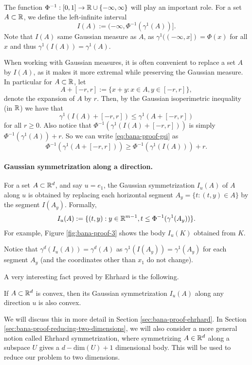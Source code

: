 The function $\Phi^{-1}:[0,1] \rightarrow  \mathbb{R} \cup \{-\infty,\infty\}$ will play an important role.
For a set $A\subset \mathbb{R}$, we define the left-infinite interval  \[I(A):=(-\infty,\Phi^{-1}(\gamma^1(A))].\]   Note that $I(A)$ same Gaussian measure as $A$, as $\gamma^1((-\infty,x]) = \Phi(x)$ for all $x$ and thus $\gamma^1(I(A))= \gamma^1(A)$.

When working with Gaussian measures, it is often convenient to replace a set $A$ by $I(A)$, as it makes it more extremal while  preserving the Gaussian measure. 
In particular for $A\subset \mathbb{R}$, let  \[A+[-r,r] := \{x+y:x\in A, y\in [-r,r]\},\]
denote the expansion of $A$ by $r$.
Then, by the Gaussian isoperimetric inequality (in $\mathbb{R}$) we have that 
 \begin{equation}
     \label{eq:bana-proof-gsi}
      \gamma^1(I(A)+[-r,r]) \leq \gamma^1(A+[-r,r])
 \end{equation}
  for all $r\geq 0$.
Also notice that $\Phi^{-1}(\gamma^1(I(A)+[-r,r]))$ is simply $ \Phi^{-1}(\gamma^1(A)) + r$. So we can write \eqref{eq:bana-proof-gsi} as
\begin{equation}
    \label{eq:bana-proof-gsi-cor} \Phi^{-1}(\gamma^1(A+[-r,r]))\geq  \Phi^{-1}(  \gamma^1(I(A))) +r.
\end{equation}



\paragraph{ Gaussian symmetrization along a direction.}
For a set $A \subset \mathbb{R}^d$, and say $u=e_1$, the Gaussian symmetrization $I_u(A)$ of $A$ along $u$ is obtained by replacing each horizontal segment $A_y = \{t:(t,y)\in A\}$ by the segment $I(A_y)$.
Formally,
\[ I_u(A) := \{ (t,y): y\in\mathbb{R}^{m-1}, t \leq \Phi^{-1}(\gamma^1(A_y))\}.\]
For example, Figure \ref{fig:bana-proof-3} shows the body $I_u(K)$ obtained from $K$.

Notice that $\gamma^d(I_u(A)) =\gamma^d(A)$ as $\gamma^1(I(A_y)) = \gamma^1(A_y)$ for each segment $A_y$ (and the coordinates other than $x_1$ do not change). 



A very interesting fact proved by Ehrhard \cite{Ehrhard1983} is the following.
\begin{theorem}
\label{thm:baby-ehrhard}
    If $A \subset \mathbb{R}^d$ is convex, then its Gaussian symmetrization $I_u(A)$ along any direction $u$ is also convex.
\end{theorem}
We will discuss this in more detail in Section \ref{sec:bana-proof-ehrhard}. 
In Section \ref{sec:bana-proof-reducing-two-dimensions}, we will also consider a more general notion called Ehrhard symmetrization, where symmetrizing $A \in \mathbb{R}^d$ along a subspace $U$ gives a $d-\text{dim}(U)+1$ dimensional body.
This will be used to reduce our problem to two dimensions. 
 

